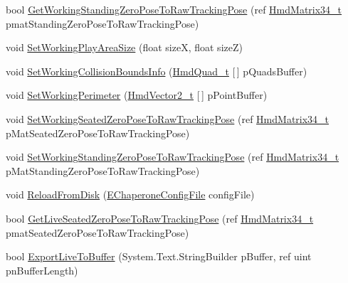 \begin{DoxyCompactItemize}
bool \mbox{\hyperlink{class_valve_1_1_v_r_1_1_c_v_r_chaperone_setup_aa39a7fd6be058cdd7de62640ebe1ec8c}{Get\+Working\+Standing\+Zero\+Pose\+To\+Raw\+Tracking\+Pose}} (ref \mbox{\hyperlink{struct_valve_1_1_v_r_1_1_hmd_matrix34__t}{Hmd\+Matrix34\+\_\+t}} pmat\+Standing\+Zero\+Pose\+To\+Raw\+Tracking\+Pose)
\item 
void \mbox{\hyperlink{class_valve_1_1_v_r_1_1_c_v_r_chaperone_setup_a3b42da20dee26b61a7352d86c76e494d}{Set\+Working\+Play\+Area\+Size}} (float sizeX, float sizeZ)
\item 
void \mbox{\hyperlink{class_valve_1_1_v_r_1_1_c_v_r_chaperone_setup_a779ba5b737b45a949fa8c23b98a309de}{Set\+Working\+Collision\+Bounds\+Info}} (\mbox{\hyperlink{struct_valve_1_1_v_r_1_1_hmd_quad__t}{Hmd\+Quad\+\_\+t}} \mbox{[}$\,$\mbox{]} p\+Quads\+Buffer)
\item 
void \mbox{\hyperlink{class_valve_1_1_v_r_1_1_c_v_r_chaperone_setup_a27603428d4c757b8ecac4e26c13ea46c}{Set\+Working\+Perimeter}} (\mbox{\hyperlink{struct_valve_1_1_v_r_1_1_hmd_vector2__t}{Hmd\+Vector2\+\_\+t}} \mbox{[}$\,$\mbox{]} p\+Point\+Buffer)
\item 
void \mbox{\hyperlink{class_valve_1_1_v_r_1_1_c_v_r_chaperone_setup_a4528ef252f374d951ba173d412dec0d8}{Set\+Working\+Seated\+Zero\+Pose\+To\+Raw\+Tracking\+Pose}} (ref \mbox{\hyperlink{struct_valve_1_1_v_r_1_1_hmd_matrix34__t}{Hmd\+Matrix34\+\_\+t}} p\+Mat\+Seated\+Zero\+Pose\+To\+Raw\+Tracking\+Pose)
\item 
void \mbox{\hyperlink{class_valve_1_1_v_r_1_1_c_v_r_chaperone_setup_a6d7f95d19b799168a2462cf1c5b25550}{Set\+Working\+Standing\+Zero\+Pose\+To\+Raw\+Tracking\+Pose}} (ref \mbox{\hyperlink{struct_valve_1_1_v_r_1_1_hmd_matrix34__t}{Hmd\+Matrix34\+\_\+t}} p\+Mat\+Standing\+Zero\+Pose\+To\+Raw\+Tracking\+Pose)
\item 
void \mbox{\hyperlink{class_valve_1_1_v_r_1_1_c_v_r_chaperone_setup_a8a87649c12b2837993e7e31f83edc4d2}{Reload\+From\+Disk}} (\mbox{\hyperlink{namespace_valve_1_1_v_r_a9d16676419221d1177d39fe862e1f7d1}{E\+Chaperone\+Config\+File}} config\+File)
\item 
bool \mbox{\hyperlink{class_valve_1_1_v_r_1_1_c_v_r_chaperone_setup_a3529a7cfb08be0cb85fa55ac70a19d8b}{Get\+Live\+Seated\+Zero\+Pose\+To\+Raw\+Tracking\+Pose}} (ref \mbox{\hyperlink{struct_valve_1_1_v_r_1_1_hmd_matrix34__t}{Hmd\+Matrix34\+\_\+t}} pmat\+Seated\+Zero\+Pose\+To\+Raw\+Tracking\+Pose)
\item 
bool \mbox{\hyperlink{class_valve_1_1_v_r_1_1_c_v_r_chaperone_setup_a0b2f938528a082e00bb40b8bf214a854}{Export\+Live\+To\+Buffer}} (System.\+Text.\+String\+Builder p\+Buffer, ref uint pn\+Buffer\+Length)

\end{DoxyCompactItemize}

